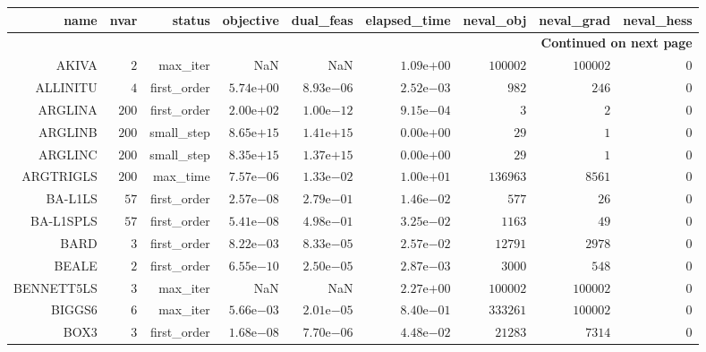 \begin{longtable}{rrrrrrrrr}
\hline
name & nvar & status & objective & dual\_feas & elapsed\_time & neval\_obj & neval\_grad & neval\_hess \\\hline
\endhead
\hline
\multicolumn{9}{r}{{\bfseries Continued on next page}}\\
\hline
\endfoot
\endlastfoot
AKIVA & \(     2\) & max\_iter &       NaN &       NaN & \( 1.09\)e\(+00\) & \(100002\) & \(100002\) & \(     0\) \\
ALLINITU & \(     4\) & first\_order & \( 5.74\)e\(+00\) & \( 8.93\)e\(-06\) & \( 2.52\)e\(-03\) & \(   982\) & \(   246\) & \(     0\) \\
ARGLINA & \(   200\) & first\_order & \( 2.00\)e\(+02\) & \( 1.00\)e\(-12\) & \( 9.15\)e\(-04\) & \(     3\) & \(     2\) & \(     0\) \\
ARGLINB & \(   200\) & small\_step & \( 8.65\)e\(+15\) & \( 1.41\)e\(+15\) & \( 0.00\)e\(+00\) & \(    29\) & \(     1\) & \(     0\) \\
ARGLINC & \(   200\) & small\_step & \( 8.35\)e\(+15\) & \( 1.37\)e\(+15\) & \( 0.00\)e\(+00\) & \(    29\) & \(     1\) & \(     0\) \\
ARGTRIGLS & \(   200\) & max\_time & \( 7.57\)e\(-06\) & \( 1.33\)e\(-02\) & \( 1.00\)e\(+01\) & \(136963\) & \(  8561\) & \(     0\) \\
BA-L1LS & \(    57\) & first\_order & \( 2.57\)e\(-08\) & \( 2.79\)e\(-01\) & \( 1.46\)e\(-02\) & \(   577\) & \(    26\) & \(     0\) \\
BA-L1SPLS & \(    57\) & first\_order & \( 5.41\)e\(-08\) & \( 4.98\)e\(-01\) & \( 3.25\)e\(-02\) & \(  1163\) & \(    49\) & \(     0\) \\
BARD & \(     3\) & first\_order & \( 8.22\)e\(-03\) & \( 8.33\)e\(-05\) & \( 2.57\)e\(-02\) & \( 12791\) & \(  2978\) & \(     0\) \\
BEALE & \(     2\) & first\_order & \( 6.55\)e\(-10\) & \( 2.50\)e\(-05\) & \( 2.87\)e\(-03\) & \(  3000\) & \(   548\) & \(     0\) \\
BENNETT5LS & \(     3\) & max\_iter &       NaN &       NaN & \( 2.27\)e\(+00\) & \(100002\) & \(100002\) & \(     0\) \\
BIGGS6 & \(     6\) & max\_iter & \( 5.66\)e\(-03\) & \( 2.01\)e\(-05\) & \( 8.40\)e\(-01\) & \(333261\) & \(100002\) & \(     0\) \\
BOX3 & \(     3\) & first\_order & \( 1.68\)e\(-08\) & \( 7.70\)e\(-06\) & \( 4.48\)e\(-02\) & \( 21283\) & \(  7314\) & \(     0\) \\

\end{longtable}
